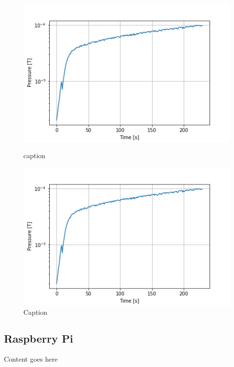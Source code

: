 \documentclass[12pt]{article}
\begin{document}
\begin{figure}[ht]
  \centering
  \begin{minipage}[b]{0.4\textwidth}
    \includegraphics[width=\textwidth]{images/example.png}
    \caption{caption}
  \end{minipage}
  \hfill
  \begin{minipage}[b]{0.4\textwidth}
    \includegraphics[width=\textwidth]{images/example.png}
    \caption{Caption}
  \end{minipage}
\end{figure}

\subsection{Raspberry Pi}
Content goes here

\newpage
\end{document}
